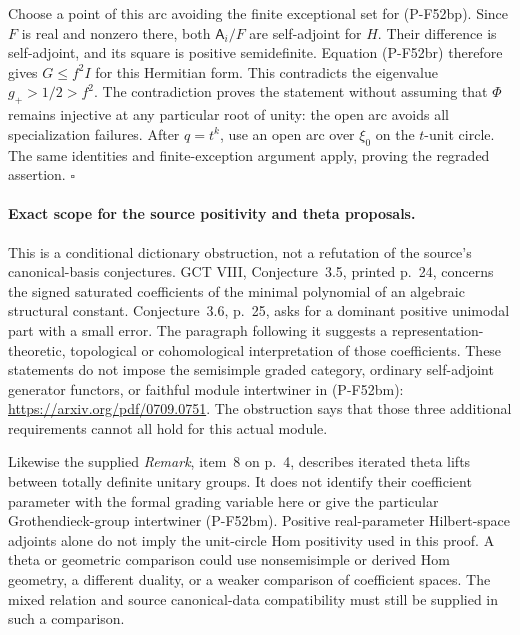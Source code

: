 Choose a point of this arc avoiding the finite exceptional
set for (P-F52bp). Since $F$ is real and nonzero there,
both $\mathsf A_i/F$ are self-adjoint for $H$.
Their difference is self-adjoint, and its square is
positive semidefinite. Equation (P-F52br) therefore gives
$G\le f^2I$ for this Hermitian form. This contradicts
the eigenvalue $g_+>1/2>f^2$.
The contradiction proves the statement without assuming
that $\Phi$ remains injective at any particular root
of unity: the open arc avoids all specialization failures.
After $q=t^k$, use an open arc over $\xi_0$ on the
$t$-unit circle. The same identities and finite-exception
argument apply, proving the regraded assertion.
\hfill$\square$

\paragraph{Exact scope for the source positivity and theta proposals.}
This is a conditional dictionary obstruction, not a
refutation of the source's canonical-basis conjectures.
GCT VIII, Conjecture~3.5, printed p.~24, concerns the
signed saturated coefficients of the minimal polynomial
of an algebraic structural constant. Conjecture~3.6,
p.~25, asks for a dominant positive unimodal part with
a small error. The paragraph following it suggests a
representation-theoretic, topological or cohomological
interpretation of those coefficients. These statements
do not impose the semisimple graded category, ordinary
self-adjoint generator functors, or faithful module
intertwiner in (P-F52bm):
\url{https://arxiv.org/pdf/0709.0751}.
The obstruction says that those three additional
requirements cannot all hold for this actual module.

Likewise the supplied \emph{Remark}, item~8 on p.~4,
describes iterated theta lifts between totally definite
unitary groups. It does not identify their coefficient
parameter with the formal grading variable here or
give the particular Grothendieck-group intertwiner
(P-F52bm). Positive real-parameter Hilbert-space
adjoints alone do not imply the unit-circle Hom
positivity used in this proof. A theta or geometric
comparison could use nonsemisimple or derived Hom
geometry, a different duality, or a weaker comparison
of coefficient spaces. The mixed relation and source
canonical-data compatibility must still be supplied
in such a comparison.
